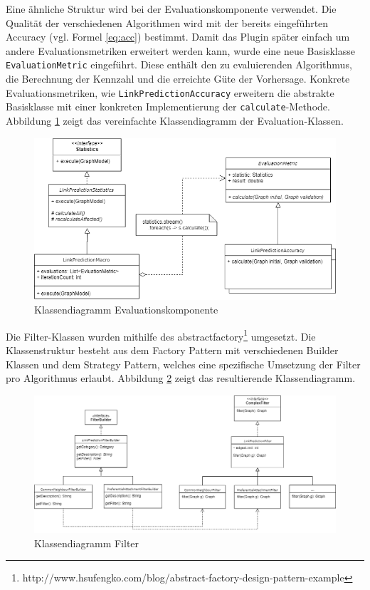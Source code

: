Eine ähnliche Struktur wird bei der Evaluationskomponente verwendet.
Die Qualität der verschiedenen Algorithmen wird mit der bereits eingeführten Accuracy (vgl. Formel \ref{eq:acc}) bestimmt.
Damit das Plugin später einfach um andere Evaluationsmetriken erweitert werden kann, wurde eine neue Basisklasse \texttt{EvaluationMetric} eingeführt.
Diese enthält den zu evaluierenden Algorithmus, die Berechnung der Kennzahl und die erreichte Güte der Vorhersage. Konkrete Evaluationsmetriken, wie \texttt{LinkPredictionAccuracy} erweitern die abstrakte Basisklasse mit einer konkreten Implementierung der \texttt{calculate}-Methode.
Abbildung \ref{fig:class_eval} zeigt das vereinfachte Klassendiagramm der Evaluation-Klassen.
\begin{figure}
    \centering
    \includegraphics[width=\linewidth]{resources/class_Evaluation.png}
    \caption{Klassendiagramm Evaluationskomponente}
    \label{fig:class_eval}
\end{figure}

Die Filter-Klassen wurden mithilfe des \acs{abstractfactory}\footnote{http://www.hsufengko.com/blog/abstract-factory-design-pattern-example} umgesetzt. Die Klassenstruktur besteht aus dem Factory Pattern mit verschiedenen Builder Klassen und dem Strategy Pattern, welches eine spezifische Umsetzung der Filter pro Algorithmus erlaubt. Abbildung \ref{fig:class_filter} zeigt das resultierende Klassendiagramm.
\begin{figure}
    \centering
    \includegraphics[width=\linewidth]{resources/class_Filter.png}
    \caption{Klassendiagramm Filter}
    \label{fig:class_filter}
\end{figure}

